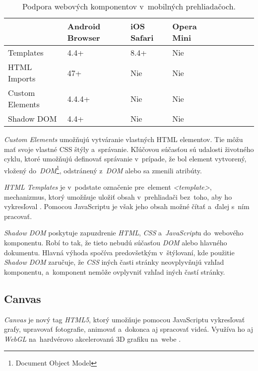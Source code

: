 \begin{table}[]
\centering
\begin{tabular}{@{}|l|l|l|l|l|l|l|l|l|@{}}
\toprule
                & Android Browser & iOS Safari & Opera Mini \\ \midrule
Templates       & 4.4+            & 8.4+       & Nie        \\ \midrule
HTML Imports    & 47+             & Nie        & Nie        \\ \midrule
Custom Elements & 4.4.4+          & Nie        & Nie        \\ \midrule
Shadow DOM      & 4.4+            & Nie        & Nie        \\ \bottomrule
\end{tabular}
\caption{Podpora webových komponentov v~mobilných prehliadačoch. \cite{MDN_Template_Element}\cite{CIU}}
\label{tab:webcomponents-support-mobile}
\end{table}


\emph{Custom Elements} umožňujú vytváranie vlastných HTML elementov. Tie môžu mať svoje vlastné CSS štýly a~správanie. Kľúčovou súčasťou sú udalosti životného cyklu, ktoré umožňujú definovať správanie v~prípade, že bol element vytvorený, vložený do~\emph{DOM}\footnote{Document Object Model}, odstránený z~\emph{DOM} alebo sa zmenili atribúty. \cite{MDN_WebComponents}

\emph{HTML Templates} je v~podstate označenie pre~element \emph{<template>}, mechanizmus, ktorý umožňuje uložiť obsah v~prehliadači bez~toho, aby ho vykresľoval \cite{MDN_Template_Element}. Pomocou JavaScriptu je však jeho obsah možné čítať a~ďalej s~ním pracovať. 

\emph{Shadow DOM} poskytuje zapuzdrenie \emph{HTML}, \emph{CSS} a~\emph{JavaScript}u do~webového komponentu. Robí to tak, že tieto nebudú súčasťou \emph{DOM} alebo hlavného dokumentu. Hlavná výhoda spočíva predovšetkým v~štýlovaní, kde použitie \emph{Shadow DOM} zaručuje, že \emph{CSS} iných časti stránky neovplyvňujú vzhľad komponentu, a~komponent nemôže ovplyvniť vzhľad iných častí stránky. \cite{MDN_Shadow_DOM}


\subsection{Canvas}
\label{sec:canvas-element}

\emph{Canvas} je nový tag \emph{HTML5}, ktorý umožňuje pomocou JavaScriptu vykresľovať grafy, upravovať fotografie, animovať a~dokonca aj spracovať videá. Využíva ho aj \emph{WebGL} na~hardvérovo akcelerovanú 3D grafiku na~webe \cite{MDN_Canvas}.

